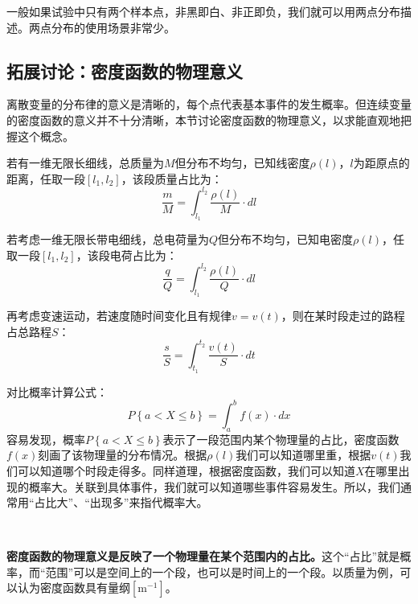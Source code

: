 \begin{tcolorbox}
一般如果试验中只有两个样本点，非黑即白、非正即负，我们就可以用两点分布描述。两点分布的使用场景非常少。
\end{tcolorbox}

\subsection{拓展讨论：密度函数的物理意义}

\begin{tcolorbox}
离散变量的分布律的意义是清晰的，每个点代表基本事件的发生概率。但连续变量的密度函数的意义并不十分清晰，本节讨论密度函数的物理意义，以求能直观地把握这个概念。
\end{tcolorbox}

若有一维无限长细线，总质量为$M$但分布不均匀，已知线密度$\rho \left( l \right) $，$l$为距原点的距离，任取一段$\left[ l_1,l_2 \right] $，该段质量占比为：
\[
\frac{m}{M}=\int_{l_1}^{l_2}{\frac{\rho \left( l \right)}{M}\cdot dl}
\]

若考虑一维无限长带电细线，总电荷量为$Q$但分布不均匀，已知电密度$\rho \left( l \right) $，任取一段$\left[ l_1,l_2 \right] $，该段电荷占比为：
\[
\frac{q}{Q}=\int_{l_1}^{l_2}{\frac{\rho \left( l \right)}{Q}\cdot dl}
\]

再考虑变速运动，若速度随时间变化且有规律$v=v\left( t \right) $，则在某时段走过的路程占总路程$S$：
\[
\frac{s}{S}=\int_{t_1}^{t_2}{\frac{v\left( t \right)}{S} \cdot dt}
\]

对比概率计算公式：
\[
P\left\{ a<X\leqslant b \right\} =\int_a^b{f\left( x \right) \cdot dx}
\]
容易发现，概率$P\left\{ a<X\leqslant b \right\} $表示了一段范围内某个物理量的占比，密度函数$f\left( x \right) $刻画了该物理量的分布情况。根据$\rho \left( l \right) $我们可以知道哪里重，根据$v \left( t \right) $我们可以知道哪个时段走得多。同样道理，根据密度函数，我们可以知道$X$在哪里出现的概率大。关联到具体事件，我们就可以知道哪些事件容易发生。所以，我们通常用“占比大”、“出现多”来指代概率大。

~

{\bf 密度函数的物理意义是反映了一个物理量在某个范围内的占比。}这个“占比”就是概率，而“范围”可以是空间上的一个段，也可以是时间上的一个段。以质量为例，可以认为密度函数具有量纲$\left[ \mathrm{m}^{-1} \right] $。




